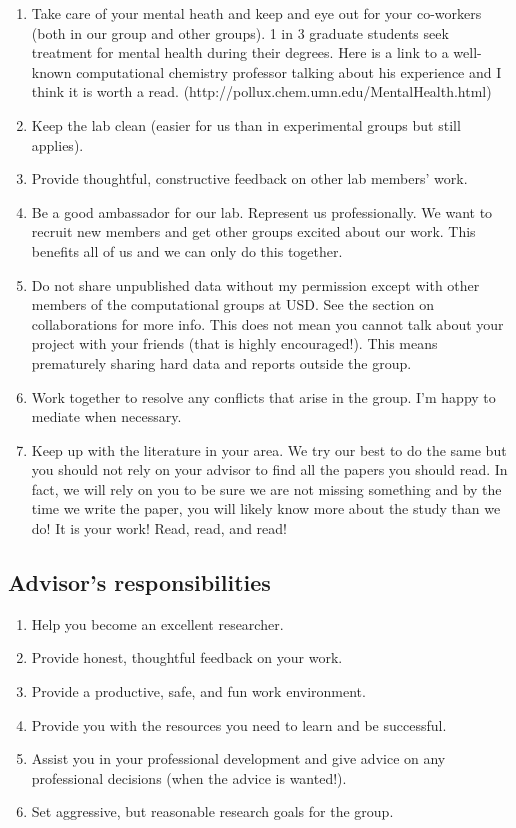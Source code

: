 \documentclass[letterpaper]{article}
\begin{document}
\begin{enumerate}
\item Take care of your mental heath and keep and eye out for your co-workers (both in our group and other groups). 1 in 3 graduate students seek treatment for mental health during their degrees. Here is a link to a well-known computational chemistry professor talking about his experience and I think it is worth a read. (http://pollux.chem.umn.edu/MentalHealth.html)
\item Keep the lab clean (easier for us than in experimental groups but still applies).
\item Provide thoughtful, constructive feedback on other lab members' work.
\item Be a good ambassador for our lab. Represent us professionally. We want to recruit new members and get other groups excited about our work. This benefits all of us and we can only do this together.
\item Do not share unpublished data without my permission except with other members of the computational groups at USD. See the section on collaborations for more info. This does not mean you cannot talk about your project with your friends (that is highly encouraged!). This means prematurely sharing hard data and reports outside the group.
\item Work together to resolve any conflicts that arise in the group. I'm happy to mediate when necessary.
\item Keep up with the literature in your area. We try our best to do the same but you should not rely on your advisor to find all the papers you should read. In fact, we will rely on you to be sure we are not missing something and by the time we write the paper, you will likely know more about the study than we do! It is your work! Read, read, and read!
\end{enumerate}

\subsection{Advisor's responsibilities}

\begin{enumerate}
\item Help you become an excellent researcher.
\item Provide honest, thoughtful feedback on your work.
\item Provide a productive, safe, and fun work environment.
\item Provide you with the resources you need to learn and be successful.
\item Assist you in your professional development and give advice on any professional decisions (when the advice is wanted!).
\item Set aggressive, but reasonable research goals for the group.
\end{enumerate}
\end{document}

